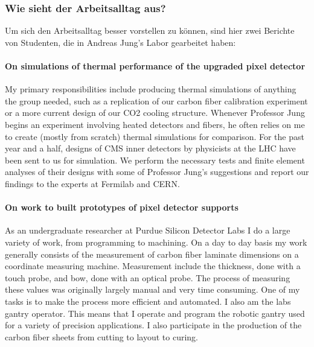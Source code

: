 \documentclass[
  paper=a4,
  fontsize=12pt,
  DIV=16,
  headheight=52pt,
  footheight=45pt,
  headinclude,
  parskip=full,
]{scrartcl}
\begin{document}
\subsubsection*{Wie sieht der Arbeitsalltag aus?}
Um sich den Arbeitsalltag besser vorstellen zu können, sind hier zwei Berichte
von Studenten, die in Andreas Jung's Labor gearbeitet haben:

\paragraph{On simulations of thermal performance of the upgraded pixel detector}
My primary responsibilities include producing thermal simulations of anything
the group needed, such as a replication of our carbon fiber calibration
experiment or a more current design of our CO2 cooling structure.
Whenever Professor Jung begins an experiment involving heated detectors and
fibers, he often relies on me to create (mostly from scratch) thermal simulations for
comparison.
For the past year and a half, designs of CMS inner detectors by physicists at
the LHC have been sent to us for simulation.
We perform the necessary tests and finite element analyses of their designs
with some of Professor Jung’s suggestions and report our findings to the
experts at Fermilab and CERN.

\paragraph{On work to built prototypes of pixel detector supports}
As an undergraduate researcher at Purdue Silicon Detector Labs I do a large
variety of work, from programming to machining.
On a day to day basis my work generally consists of the measurement of carbon
fiber laminate dimensions on a coordinate measuring machine.
Measurement include the thickness, done with a touch probe, and bow, done with
an optical probe.
The process of measuring these values was originally largely manual and very
time consuming.
One of my tasks is to make the process more efficient and automated.
I also am the labs gantry operator.
This means that I operate and program the robotic gantry used for a variety of
precision applications.
I also participate in the production of the carbon fiber sheets from cutting
to layout to curing.
\end{document}

